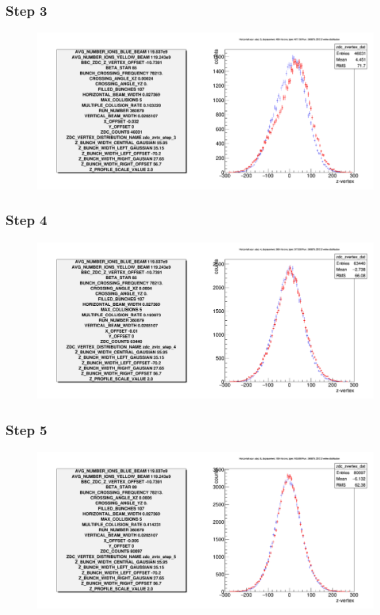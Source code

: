 \begin{frame}
  \frametitle{Step 3}
  \begin{figure}
    \includegraphics[width=\linewidth]{"./figures/tuned_simulation_step_3"}
    \caption{}
    \label{fig:step_3}
  \end{figure}
\end{frame}

\begin{frame}
  \frametitle{Step 4}
  \begin{figure}
    \includegraphics[width=\linewidth]{"./figures/tuned_simulation_step_4"}
    \caption{}
    \label{fig:step_4}
  \end{figure}
\end{frame}

\begin{frame}
  \frametitle{Step 5}
  \begin{figure}
    \includegraphics[width=\linewidth]{"./figures/tuned_simulation_step_5"}
    \caption{}
    \label{fig:step_5}
  \end{figure}
\end{frame}

